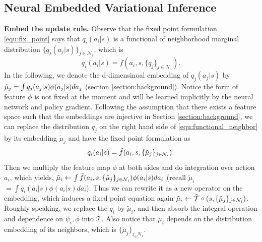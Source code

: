 \documentclass[11pt,a4paper]{article}
\theoremstyle{definition}
\begin{document}
\subsection{Neural Embedded Variational Inference}\label{section:neural_embedd_vi}
{\bf Embed the update rule.}
Observe that the fixed point formulation \eqref{equ:fix_point} says that $q_i(a_i|s)$ is a functional of neighborhood marginal distribution $\{q_j(a_j|s)\}_{j\in \mathcal{N}_i}$, which is
\begin{equation}\label{equ:functional_neighbor}
q_i(a_i|s)=f(a_i,s, \{q_j\}_{j\in \mathcal{N}_i}).
\end{equation}
In the following, we denote the d-dimensinoal embedding of  $q_j(a_j|s)$ by $\Tilde{\mu}_j=\int q_j(a_j|s) \phi(a_j|s)da_j$ (section \ref{section:background}).
Notice  the form of feature $\phi$ is not fixed at the moment and will be learned implicitly by the neural network and policy gradient. Following the assumption that there exists a feature space such that the embeddings are injective in Section \ref{section:background}, we can replace the distribution $q_j$ on the right hand side of \eqref{equ:functional_neighbor} by its  embedding $\tilde{\mu}_j$ and have the fixed point formulation as 
\begin{equation}\label{equ:output_distribution}
q_i(a_i|s)=\Tilde{f}(a_i,s,\{\Tilde{\mu}_j\}_{j\in{\mathcal{N}_i}}). 
\end{equation}
Then we multiply the feature map $\phi$ at both sides and do integration over action $a_i$, which yields, $  \Tilde{\mu}_i\leftarrow \int \Tilde{f}(a_i,s,\{\Tilde{\mu}_j\}_{j\in{\mathcal{N}_i}})\phi(a_i|s)da_i$ (recall $\tilde{\mu}_i$ $=\int q_i(a_i|s) \phi(a_i|s)da_i$).  Thus we can rewrite it as a new operator on the  embedding, which induces a fixed point equation again $\Tilde{ \mu }_i \leftarrow \Tilde{\mathcal{T}}\circ (s, \{\Tilde{\mu}_j\}_{j\in \mathcal{N}_i})$.
Roughly speaking, we replace the $q_i$ by $\tilde{\mu}_i$, and then absorb the integral operation and dependence on $\psi_i,\phi$ into $\tilde{\mathcal{T}}$.
Also notice that $\mu_i$ depends on the distribution embedding of its neighbors, which is $\{\tilde{\mu}_j\}_{j_\in \mathcal{N}_i}$.
\end{document}
